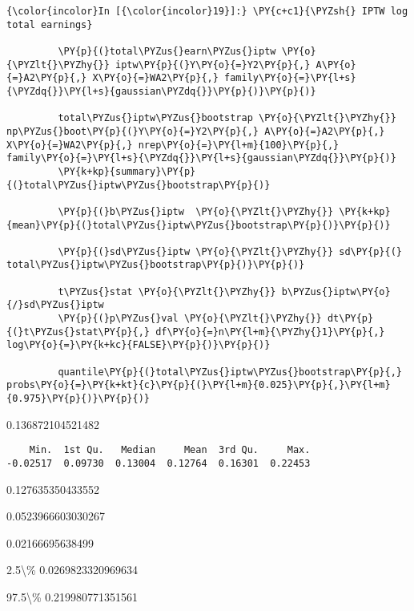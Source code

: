    \begin{Verbatim}[commandchars=\\\{\}]
{\color{incolor}In [{\color{incolor}19}]:} \PY{c+c1}{\PYZsh{} IPTW log total earnings}
         
         \PY{p}{(}total\PYZus{}earn\PYZus{}iptw \PY{o}{\PYZlt{}\PYZhy{}} iptw\PY{p}{(}Y\PY{o}{=}Y2\PY{p}{,} A\PY{o}{=}A2\PY{p}{,} X\PY{o}{=}WA2\PY{p}{,} family\PY{o}{=}\PY{l+s}{\PYZdq{}}\PY{l+s}{gaussian\PYZdq{}}\PY{p}{)}\PY{p}{)}
         
         total\PYZus{}iptw\PYZus{}bootstrap \PY{o}{\PYZlt{}\PYZhy{}} np\PYZus{}boot\PY{p}{(}Y\PY{o}{=}Y2\PY{p}{,} A\PY{o}{=}A2\PY{p}{,} X\PY{o}{=}WA2\PY{p}{,} nrep\PY{o}{=}\PY{l+m}{100}\PY{p}{,} family\PY{o}{=}\PY{l+s}{\PYZdq{}}\PY{l+s}{gaussian\PYZdq{}}\PY{p}{)} 
         \PY{k+kp}{summary}\PY{p}{(}total\PYZus{}iptw\PYZus{}bootstrap\PY{p}{)}
         
         \PY{p}{(}b\PYZus{}iptw  \PY{o}{\PYZlt{}\PYZhy{}} \PY{k+kp}{mean}\PY{p}{(}total\PYZus{}iptw\PYZus{}bootstrap\PY{p}{)}\PY{p}{)}
         
         \PY{p}{(}sd\PYZus{}iptw \PY{o}{\PYZlt{}\PYZhy{}} sd\PY{p}{(}  total\PYZus{}iptw\PYZus{}bootstrap\PY{p}{)}\PY{p}{)}
         
         t\PYZus{}stat \PY{o}{\PYZlt{}\PYZhy{}} b\PYZus{}iptw\PY{o}{/}sd\PYZus{}iptw
         \PY{p}{(}p\PYZus{}val \PY{o}{\PYZlt{}\PYZhy{}} dt\PY{p}{(}t\PYZus{}stat\PY{p}{,} df\PY{o}{=}n\PY{l+m}{\PYZhy{}1}\PY{p}{,} log\PY{o}{=}\PY{k+kc}{FALSE}\PY{p}{)}\PY{p}{)}
         
         quantile\PY{p}{(}total\PYZus{}iptw\PYZus{}bootstrap\PY{p}{,} probs\PY{o}{=}\PY{k+kt}{c}\PY{p}{(}\PY{l+m}{0.025}\PY{p}{,}\PY{l+m}{0.975}\PY{p}{)}\PY{p}{)}
\end{Verbatim}


    0.136872104521482

    
    
    \begin{verbatim}
    Min.  1st Qu.   Median     Mean  3rd Qu.     Max. 
-0.02517  0.09730  0.13004  0.12764  0.16301  0.22453 
    \end{verbatim}

    
    0.127635350433552

    
    0.0523966603030267

    
    0.02166695638499

    
    \begin{description*}
\item[2.5\textbackslash{}\%] 0.0269823320969634
\item[97.5\textbackslash{}\%] 0.219980771351561
\end{description*}

